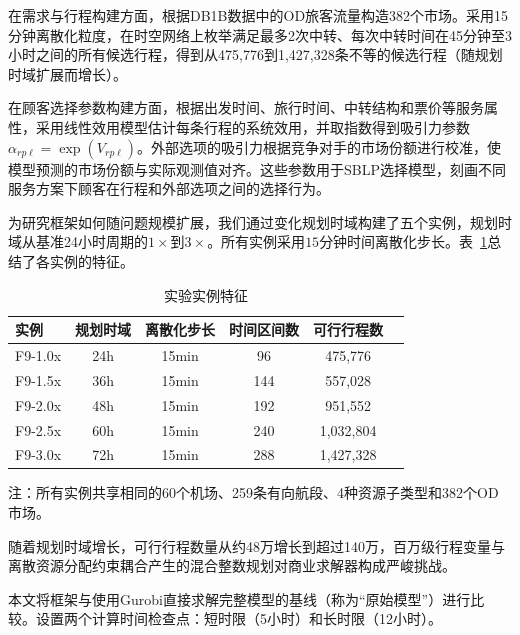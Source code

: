 在需求与行程构建方面，根据DB1B数据中的OD旅客流量构造382个市场。采用15分钟离散化粒度，在时空网络上枚举满足最多2次中转、每次中转时间在45分钟至3小时之间的所有候选行程，得到从475,776到1,427,328条不等的候选行程（随规划时域扩展而增长）。

在顾客选择参数构建方面，根据出发时间、旅行时间、中转结构和票价等服务属性，采用线性效用模型估计每条行程的系统效用，并取指数得到吸引力参数$\alpha_{rp\ell} = \exp(V_{rp\ell})$。外部选项的吸引力根据竞争对手的市场份额进行校准，使模型预测的市场份额与实际观测值对齐。这些参数用于SBLP选择模型，刻画不同服务方案下顾客在行程和外部选项之间的选择行为。


为研究框架如何随问题规模扩展，我们通过变化规划时域构建了五个实例，规划时域从基准24小时周期的$1\times$到$3\times$。所有实例采用$15$分钟时间离散化步长。表~\ref{tab:f9_instances}总结了各实例的特征。

\begin{table}[htbp]
\centering
\caption{实验实例特征}
\label{tab:f9_instances}
\begin{tabular}{lccccc}
\toprule
实例 & 规划时域 & 离散化步长 & 时间区间数 & 可行行程数 \\
\midrule
F9-1.0x & 24h  & 15min & 96   & 475{,}776 \\
F9-1.5x & 36h  & 15min & 144  & 557{,}028 \\
F9-2.0x & 48h  & 15min & 192  & 951{,}552 \\
F9-2.5x & 60h  & 15min & 240  & 1{,}032{,}804 \\
F9-3.0x & 72h  & 15min & 288  & 1{,}427{,}328 \\
\bottomrule
\end{tabular}
\vspace{0.5em}
\begin{minipage}{0.88\textwidth}
\footnotesize
注：所有实例共享相同的60个机场、259条有向航段、4种资源子类型和382个OD市场。
\end{minipage}
\end{table}

随着规划时域增长，可行行程数量从约48万增长到超过140万，百万级行程变量与离散资源分配约束耦合产生的混合整数规划对商业求解器构成严峻挑战。

本文将\algoNotation 框架与使用Gurobi\citep{Guro25}直接求解完整模型的基线（称为“原始模型”）进行比较。设置两个计算时间检查点：短时限（5小时）和长时限（12小时）。


